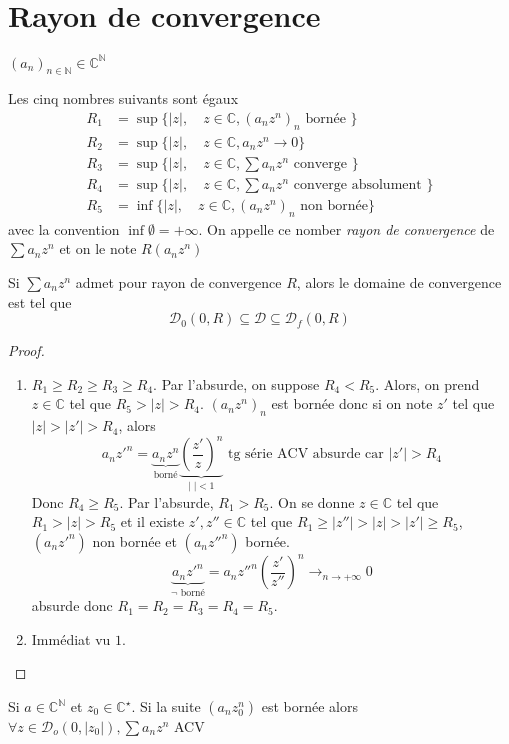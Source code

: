 \section{Rayon de convergence}
\begin{thmdef}
    \Hyp $(a_n)_{n\in\mathbb N}\in\mathbb C^{\mathbb N}$
    \begin{concenum}
    \item Les cinq nombres suivants sont égaux {\begin{align*}
                R_1 &= \sup\{|z|, \quad z\in\mathbb C, (a_nz^n)_n\text{ bornée }\} \\
                R_2 &= \sup\{|z|, \quad z\in\mathbb C, a_nz^n\longrightarrow 0\}\\
                R_3 &= \sup\{|z|, \quad z\in\mathbb C, \sum a_nz^n\text{ converge }\} \\
                R_4 &= \sup\{|z|, \quad z\in\mathbb C, \sum a_nz^n\text{ converge absolument }\} \\
                R_5 &= \inf\{|z|, \quad z\in\mathbb C, (a_nz^n)_n\text{ non bornée}\}
    \end{align*}
avec la convention $\inf\emptyset=+\infty$.}
    On appelle ce nomber \emph{rayon de convergence} de $\sum a_nz^n$ et on le note $R(a_nz^n)$
\item Si $\sum a_nz^n$ admet pour rayon de convergence $R$, alors le domaine de convergence est tel que \[
        \mathcal D_0(0, R)\subseteq \mathcal D\subseteq \mathcal D_f(0, R)
    \]
    \end{concenum}
\end{thmdef}

\begin{proof}
    \begin{enumerate}
        \item $R_1\geq R_2\geq R_3\geq R_4$. Par l'absurde, on suppose $R_4<R_5$. Alors, on prend $z\in\mathbb C$ tel que $R_5>|z|>R_4$. $(a_nz^n)_n$ est bornée donc si on note $z'$ tel que $|z|>|z'|>R_4$, alors \[
                a_nz'^n=\underbrace{a_nz^n}_{\text{borné}} \underbrace{\left( \frac{z'}{z}  \right)^n}_{|\;|<1} \text{ tg série ACV absurde car }|z'|>R_4
            \]
            Donc $R_4\geq R_5$. Par l'absurde, $R_1>R_5$. On se donne $z\in\mathbb C$ tel que $R_1>|z|>R_5$ et il existe $z', z''\in\mathbb C$ tel que $R_1\geq |z''|>|z|>|z'|\geq R_5$, $(a_nz'^n)$ non bornée et $(a_nz''^n)$ bornée. \[
                \underbrace{a_nz'^n}_{\lnot \text{ borné}}=a_nz''^n \left( \frac{z'}{z''} \right)^n\xrightarrow{}_{n\to+\infty}0
            \]
            absurde donc $R_1=R_2=R_3=R_4=R_5$.
        \item Immédiat vu $1$.
    \end{enumerate}
\end{proof}
% 
\begin{rem}
    Si $a\in\mathbb C^{\mathbb N}$ et $z_0\in\mathbb C^\star$. Si la suite $(a_nz_0^n)$ est bornée alors $\forall z\in\mathcal D_o(0, |z_0|), \sum a_nz^n$ ACV
\end{rem}


